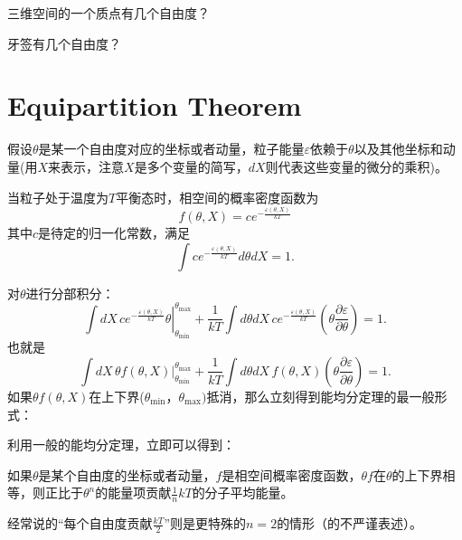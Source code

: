 \documentclass[CJK]{beamer}
\begin{document}
\begin{frame}
\bch
    {\large
      三维空间的一个质点有几个自由度？
    }


\ech
\end{frame}


\begin{frame}
\bch

    {\large
      牙签有几个自由度？
      }


\ech
\end{frame}

\section{Equipartition Theorem}



\begin{frame}
\bch
{\large
  假设$\theta$是某一个自由度对应的坐标或者动量，粒子能量$\varepsilon$依赖于$\theta$以及其他坐标和动量(用$X$来表示，注意$X$是多个变量的简写，$dX$则代表这些变量的微分的乘积)。

  当粒子处于温度为$T$平衡态时，相空间的概率密度函数为
$$f(\theta,X) = c e^{-\frac{\varepsilon(\theta,X)}{kT}} $$
其中$c$是待定的归一化常数，满足
$$  \int c e^{-\frac{\varepsilon(\theta,X)}{kT}} d\theta dX = 1. $$
}
\ech
\end{frame}


\begin{frame}
\bch
    {\large
      对$\theta$进行分部积分：
      $$ \int dX\, \left. c e^{-\frac{\varepsilon(\theta,X)}{kT}} \theta\right\vert_{\theta_{\min}}^{\theta_{\max}} + \frac{1}{kT}\int d\theta dX \, c e^{-\frac{\varepsilon(\theta,X)}{kT}} \left(\theta\frac{\partial\varepsilon}{\partial\theta}\right)  = 1. $$
      也就是
      $$ \int dX\, \left.  \theta  f(\theta,X) \right\vert_{\theta_{\min}}^{\theta_{\max}} + \frac{1}{kT}\int d\theta dX \,  f(\theta,X)\left(\theta\frac{\partial\varepsilon}{\partial\theta}\right)  = 1. $$
      {\blue 如果$\theta f(\theta,X)$在上下界($\theta_{\min}$，$\theta_{\max})$抵消}，那么立刻得到能均分定理的最一般形式：
   }
\ech
\end{frame}

\begin{frame}
\bch
{\large
利用一般的能均分定理，立即可以得到：

\skipline

{\blue 如果$\theta$是某个自由度的坐标或者动量，$f$是相空间概率密度函数，$\theta f$在$\theta$的上下界相等，则正比于$\theta^n$的能量项贡献$\frac{1}{n}kT$的分子平均能量。}


\skipline

经常说的“每个自由度贡献$\frac{kT}{2}$”则是更特殊的$n=2$的情形（的不严谨表述）。

}
\ech
\end{frame}
\end{document}
